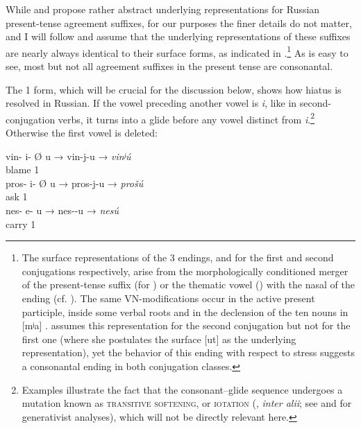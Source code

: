\documentclass[output=paper,colorlinks,citecolor=black,koreanfont]{langscibook}
\begin{document}
While \citet{Lightner1965,Lightner1972} and \citet{Halle1973} propose rather abstract underlying representations for Russian present-tense agreement suffixes, for our purposes the finer details do not matter, and I will follow \citet{Melvold1989} and assume that the underlying representations of these suffixes are nearly always identical to their surface forms, as indicated in .\footnote{The surface representations of the {3\PL} endings,  and  for the first and second conjugations respectively, arise from the morphologically conditioned merger of the present-tense suffix  (for ) or the thematic vowel  () with the nasal of the ending (cf. \citealt{Lightner1969,Kayne1967}). The same VN-modifications occur in the active present participle, inside some verbal roots and in the declension of the ten nouns in [mʲa] \citep{Lightner1967,Halle2004}. \citet[237]{Melvold1989} assumes this representation for the second conjugation but not for the first one (where she postulates the surface [ut] as the underlying representation), yet the behavior of this ending with respect to stress suggests a consonantal ending in both conjugation classes.} As is easy to see, most but not all agreement suffixes in the present tense are consonantal.

The {1\SG} form, which will be crucial for the discussion below, shows how hiatus is resolved in Russian. If the vowel preceding another vowel is \textit{i}, like in second-conjugation verbs, it turns into a glide before any vowel distinct from \textit{i}.\footnote{\label{mat:fn:Iotation}Examples  illustrate the fact that the consonant--glide sequence undergoes a mutation known as \textsc{transitive softening}, or \textsc{iotation} (\citealt{Jakobson1929,Meillet1934,Kortlandt1994,TownsendJanda1996}, \textit{inter alii}; see \citealt{Halle1963,Lightner1972,CoatsLightner1975,Bethin1992,Brown1998} and \citealt{RubachBooij2001} for generativist analyses), which will not be directly relevant here.} Otherwise the first vowel is deleted:

\ea\label{mat:ex:VowelDeletion}
\ea\label{mat:ex:VowelDeletionA}\gll vin- i- Ø u → vin-j-u → \textit{vinʲú} \\
blame {\THEM} {\PRS} {1\SG}\\
\ex\label{mat:ex:VowelDeletionB}\gll pros- i- Ø u → pros-j-u → \textit{prošú} \\
ask {\THEM} {\PRS} {1\SG}\\
\ex\label{mat:ex:VowelDeletionC}\gll nes- e- u → nes--u → \textit{nesú} \\
carry {\PRS} {1\SG}\\
\z
\z
\end{document}
